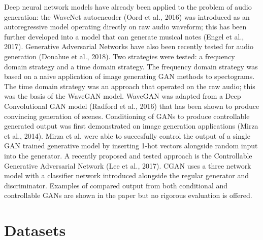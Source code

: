 \documentclass{article}
\begin{document}
Deep neural network models have already been applied to the problem of audio generation: the WaveNet autoencoder (Oord et al., 2016) was introduced as an autoregressive model operating directly on raw audio waveform; this has been further developed into a model that can generate musical notes (Engel et al., 2017).
\newline
\newline
Generative Adversarial Networks have also been recently tested for audio generation (Donahue et al., 2018).
Two strategies were tested: a frequency domain strategy and a time domain strategy.
The frequency domain strategy was based on a naive application of image generating GAN methods to spectograms.
The time domain strategy was an approach that operated on the raw audio; this was the basis of the WaveGAN model.
WaveGAN was adapted from a Deep Convolutional GAN model (Radford et al., 2016) that has been shown to produce convincing generation of scenes.
\newline
\newline
Conditioning of GANs to produce controllable generated output was first demonstrated on image generation applications (Mirza et al., 2014).
Mirza et al. were able to succesfully control the output of a single GAN trained generative model by inserting 1-hot vectors alongside random input into the generator.
\newline
\newline
A recently proposed and tested approach is the Controllable Generative Adversarial Network (Lee et al., 2017).
CGAN uses a three network model with a classifier network introduced alongside the regular generator and discriminator.
Examples of compared output from both conditional and controllable GANs are shown in the paper but no rigorous evaluation is offered.

\section{Datasets}
\end{document}
